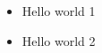 \documentclass{article}
\begin{document}
\begin{itemize}[leftmargin=*]
\item Hello world 1
\item Hello world 2
\end{itemize}
\end{document}

